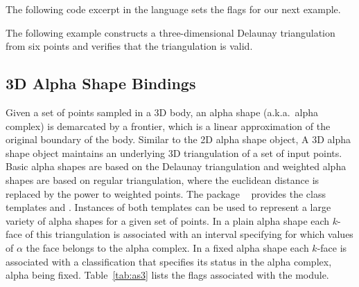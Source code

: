 The following code excerpt in the \cmake{} language sets the \cmake{}
flags for our next example.

The following example constructs a three-dimensional Delaunay
triangulation from six points and verifies that the triangulation is valid.

\subsection{3D Alpha Shape Bindings}
\label{ssec:modules:as3}
Given a set of points sampled in a 3D body, an alpha shape
(a.k.a.\ alpha complex) is demarcated by a frontier, which is a linear
approximation of the original boundary of the body. Similar to the 2D
alpha shape object, A 3D alpha shape object maintains an underlying 3D
triangulation of a set of input points. Basic alpha shapes are based
on the Delaunay triangulation and weighted alpha shapes are based on
regular triangulation, where the euclidean distance is replaced by the
power to weighted points. The package
\iiiDAlphaShapesPackage{}~\cite{cgal:dy-as3-21a} provides the class
templates 
and . Instances of both
templates can be used to represent a large variety of alpha shapes for
a given set of points. In a plain alpha shape each $k$-face of this
triangulation is associated with an interval specifying for which
values of $\alpha$ the face belongs to the alpha complex. In a fixed
alpha shape each $k$-face is associated with a classification that
specifies its status in the alpha complex, alpha being
fixed. Table~\ref{tab:as3} lists the \cmake{} flags associated with
the \iiiDAlphaShapesPackage{} module.

\begin{table}[!htp]
  \caption{\iiiDAlphaShapesPackage{} module flags}
  \centering{}
 \label{tab:as3}
\end{table}

